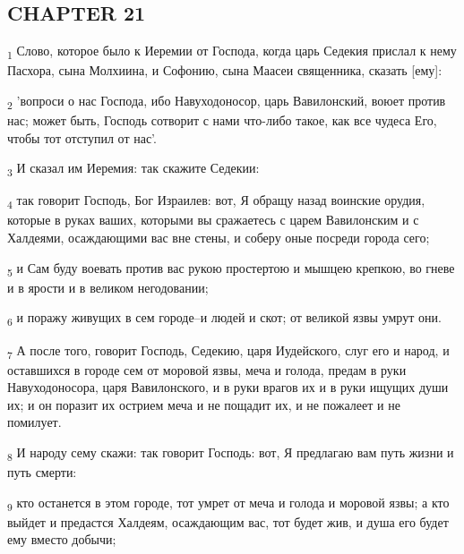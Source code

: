 \subsection{CHAPTER 21}
\begin{tcolorbox}
\textsubscript{1} Слово, которое было к Иеремии от Господа, когда царь Седекия прислал к нему Пасхора, сына Молхиина, и Софонию, сына Маасеи священника, сказать [ему]:
\end{tcolorbox}
\begin{tcolorbox}
\textsubscript{2} 'вопроси о нас Господа, ибо Навуходоносор, царь Вавилонский, воюет против нас; может быть, Господь сотворит с нами что-либо такое, как все чудеса Его, чтобы тот отступил от нас'.
\end{tcolorbox}
\begin{tcolorbox}
\textsubscript{3} И сказал им Иеремия: так скажите Седекии:
\end{tcolorbox}
\begin{tcolorbox}
\textsubscript{4} так говорит Господь, Бог Израилев: вот, Я обращу назад воинские орудия, которые в руках ваших, которыми вы сражаетесь с царем Вавилонским и с Халдеями, осаждающими вас вне стены, и соберу оные посреди города сего;
\end{tcolorbox}
\begin{tcolorbox}
\textsubscript{5} и Сам буду воевать против вас рукою простертою и мышцею крепкою, во гневе и в ярости и в великом негодовании;
\end{tcolorbox}
\begin{tcolorbox}
\textsubscript{6} и поражу живущих в сем городе--и людей и скот; от великой язвы умрут они.
\end{tcolorbox}
\begin{tcolorbox}
\textsubscript{7} А после того, говорит Господь, Седекию, царя Иудейского, слуг его и народ, и оставшихся в городе сем от моровой язвы, меча и голода, предам в руки Навуходоносора, царя Вавилонского, и в руки врагов их и в руки ищущих души их; и он поразит их острием меча и не пощадит их, и не пожалеет и не помилует.
\end{tcolorbox}
\begin{tcolorbox}
\textsubscript{8} И народу сему скажи: так говорит Господь: вот, Я предлагаю вам путь жизни и путь смерти:
\end{tcolorbox}
\begin{tcolorbox}
\textsubscript{9} кто останется в этом городе, тот умрет от меча и голода и моровой язвы; а кто выйдет и предастся Халдеям, осаждающим вас, тот будет жив, и душа его будет ему вместо добычи;
\end{tcolorbox}
